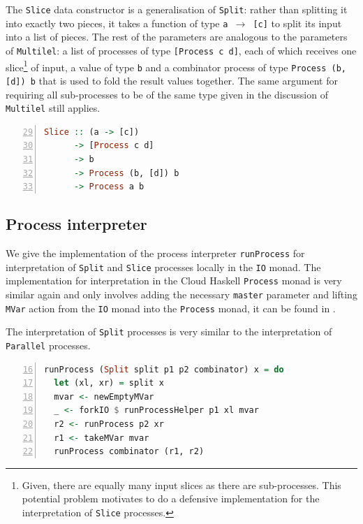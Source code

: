 The \texttt{Slice} data constructor is a generalisation of \texttt{Split}: rather than splitting it into exactly two pieces, it takes a function of type \texttt{a $\to$ [c]} to split its input into a list of pieces. The rest of the parameters are analogous to the parameters of \texttt{Multilel}: a list of processes of type \texttt{[Process c d]}, each of which receives one slice\footnote{Given, there are equally many input slices as there are sub-processes. This potential problem motivates to do a defensive implementation for the interpretation of \texttt{Slice} processes.} of input, a value of type \texttt{b} and a combinator process of type \texttt{Process (b, [d]) b} that is used to fold the result values together. The same argument for requiring all sub-processes to be of the same type given in the discussion of \texttt{Multilel} still applies.
\begin{lstlisting}[language=Haskell,caption=Signature of the \texttt{Slice} data constructor.,numbers=left,frame=bt,firstnumber=29]
Slice :: (a -> [c])
      -> [Process c d]
      -> b
      -> Process (b, [d]) b
      -> Process a b
\end{lstlisting}

\subsection{Process interpreter}
We give the implementation of the process interpreter \texttt{runProcess} for interpretation of \texttt{Split} and \texttt{Slice} processes locally in the \texttt{IO} monad. The implementation for interpretation in the \textsf{Cloud Haskell} \texttt{Process} monad is very similar again and only involves adding the necessary \texttt{master} parameter and lifting \texttt{MVar} action from the \texttt{IO} monad into the \texttt{Process} monad, it can be found in .

The interpretation of \texttt{Split} processes is very similar to the interpretation of \texttt{Parallel} processes.
\begin{lstlisting}[language=Haskell,caption=Implementation of the interpreter for \texttt{Split} processes.,label=lst:local_runprocess_multilel,numbers=left,frame=bt,firstnumber=16]
runProcess (Split split p1 p2 combinator) x = do
  let (xl, xr) = split x
  mvar <- newEmptyMVar
  _ <- forkIO $ runProcessHelper p1 xl mvar
  r2 <- runProcess p2 xr
  r1 <- takeMVar mvar
  runProcess combinator (r1, r2)
\end{lstlisting}

